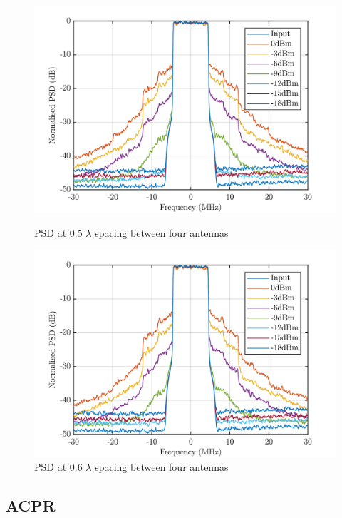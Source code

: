 \begin{figure}[H]
  \centering
  \begin{minipage}[b]{0.5\textwidth}
	\includegraphics[scale = 0.5]{figures/measurement/four_antenna/psd_0p5.png}
	\caption{PSD at 0.5 $\lambda$ spacing between four antennas}
    \label{fig:psd05_4}
  \end{minipage}
  \hfill
  \begin{minipage}[b]{0.4\textwidth}
\includegraphics[scale = 0.5]{figures/measurement/four_antenna/psd_0p6.png}
\caption{PSD at 0.6 $\lambda$ spacing between four antennas}
    \label{fig:psd06_4}
  \end{minipage}
\end{figure}

\subsection{ACPR} %

